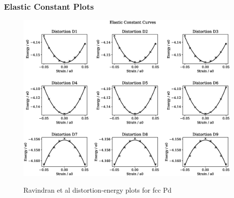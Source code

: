 \clearpage
\subsubsection{Elastic Constant Plots}

\begin{figure}[htb]
\centering
\includegraphics[width=.90\linewidth]{chapters/potentials_fe_pd_ru/fepd_potential/ec_rfkj/elastic_strains_bp_0.eps}  
\label{fig:fepd-fefcc-distortions}
\caption{Ravindran et al\cite{dfttisiravindran} distortion-energy plots for \acrshort{fcc} Pd}
\end{figure}

